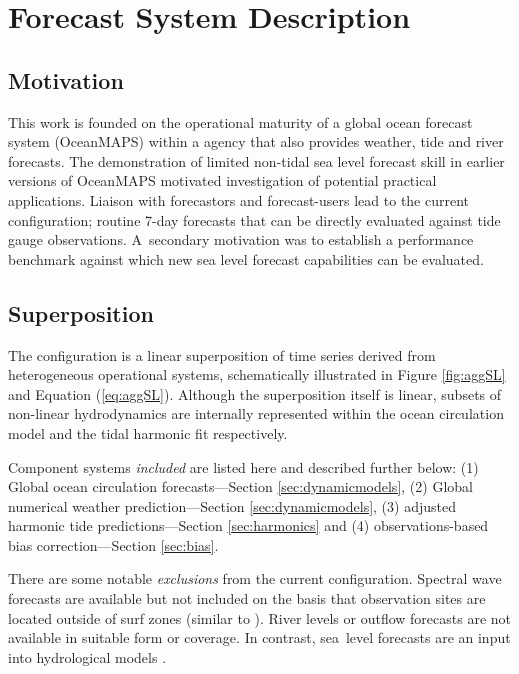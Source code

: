 \documentclass[jmse,article,accept,moreauthors,pdftex,10pt,a4paper]{mdpi}
\begin{document}
\section{Forecast System Description}
\vspace{-6pt}
\subsection{Motivation}
This work is founded on the operational maturity of a global ocean forecast system (OceanMAPS) within a agency that also provides weather, tide and river forecasts.
The demonstration of limited non-tidal sea level forecast skill in earlier versions of OceanMAPS \cite{Taylor:2010ud} motivated investigation of potential practical applications. 
Liaison with forecastors and forecast-users lead to the current configuration; routine 7-day forecasts that can be directly evaluated against tide gauge observations.
A~secondary motivation was to establish a performance benchmark against which new sea level forecast capabilities can be evaluated. 

\subsection{Superposition}
\label{sec:concept}
The configuration is a linear superposition of time series derived from heterogeneous operational systems, schematically illustrated in Figure \ref{fig:aggSL} and Equation (\ref{eq:aggSL}).  
Although the superposition itself is linear, subsets of non-linear hydrodynamics are internally represented within the ocean circulation model  and the tidal harmonic fit respectively.

Component systems \textit{included} are listed here and described further below:
(1) Global ocean circulation forecasts---Section \ref{sec:dynamicmodels}, 
(2) Global numerical weather prediction---Section \ref{sec:dynamicmodels}, 
(3) adjusted harmonic tide predictions---Section \ref{sec:harmonics} and 
(4) observations-based bias correction---Section \ref{sec:bias}.

There are some notable \textit{exclusions} from the current configuration.
Spectral wave forecasts are available but not included on the basis that observation sites are located outside of surf zones (similar to  \cite{Tilburg:2004cg}).
River levels or outflow forecasts are not available in suitable form or coverage. In contrast, sea~level forecasts are an input into hydrological models \cite{Taylor:2011ud}.  
\end{document}
